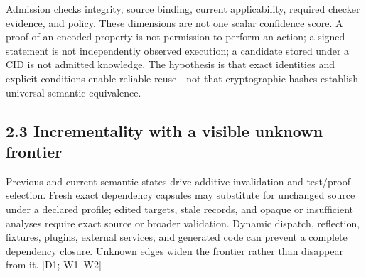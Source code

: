 \documentclass{article}
\begin{document}
Admission checks integrity, source binding, current applicability, required checker evidence, and
policy. These dimensions are not one scalar confidence score. A proof of an encoded property is
not permission to perform an action; a signed statement is not independently observed execution; a
candidate stored under a CID is not admitted knowledge. The hypothesis is that exact identities and
explicit conditions enable reliable reuse—not that cryptographic hashes establish universal semantic
equivalence.

\subsection*{2.3 Incrementality with a visible unknown frontier}

Previous and current semantic states drive additive invalidation and test/proof selection. Fresh exact
dependency capsules may substitute for unchanged source under a declared profile; edited targets,
stale records, and opaque or insufficient analyses require exact source or broader validation. Dynamic
dispatch, reflection, fixtures, plugins, external services, and generated code can prevent a complete
dependency closure. Unknown edges widen the frontier rather than disappear from it. [D1; W1–W2]
\end{document}
